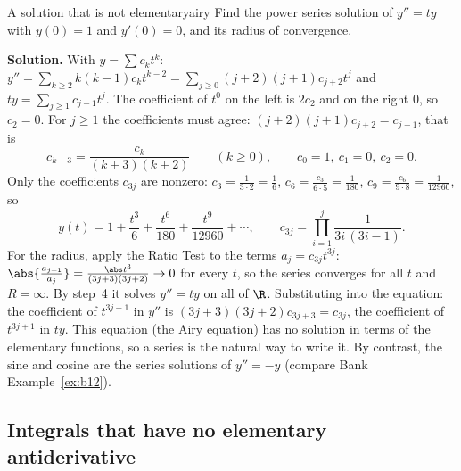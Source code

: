 \documentclass[11pt]{article}
\begin{document}
\begin{exmp}{A solution that is not elementary}{airy}
Find the power series solution of $y''=ty$ with $y(0)=1$ and $y'(0)=0$, and its radius of convergence.

\textbf{Solution.} With $y=\sum c_kt^k$: $y''=\sum_{k\ge2}k(k-1)c_kt^{k-2}=\sum_{j\ge0}(j+2)(j+1)c_{j+2}t^j$ and $ty=\sum_{j\ge1}c_{j-1}t^j$. The coefficient of $t^0$ on the left is $2c_2$ and on the right $0$, so $c_2=0$. For $j\ge1$ the coefficients must agree: $(j+2)(j+1)c_{j+2}=c_{j-1}$, that is
\[
c_{k+3}=\frac{c_k}{(k+3)(k+2)}\qquad(k\ge0),\qquad c_0=1,\ c_1=0,\ c_2=0 .
\]
Only the coefficients $c_{3j}$ are nonzero: $c_3=\frac{1}{3\cdot2}=\frac16$, $c_6=\frac{c_3}{6\cdot5}=\frac1{180}$, $c_9=\frac{c_6}{9\cdot8}=\frac1{12960}$, so
\[
y(t)=1+\frac{t^3}6+\frac{t^6}{180}+\frac{t^9}{12960}+\cdots,\qquad c_{3j}=\prod_{i=1}^{j}\frac1{3i\,(3i-1)}.
\]
For the radius, apply the Ratio Test to the terms $a_j=c_{3j}t^{3j}$: $\abs{\frac{a_{j+1}}{a_j}}=\frac{\abs t^3}{(3j+3)(3j+2)}\to0$ for every $t$, so the series converges for all $t$ and $R=\infty$. By step~4 it solves $y''=ty$ on all of $\R$. Substituting into the equation: the coefficient of $t^{3j+1}$ in $y''$ is $(3j+3)(3j+2)c_{3j+3}=c_{3j}$, the coefficient of $t^{3j+1}$ in $ty$.
This equation (the Airy equation) has no solution in terms of the elementary functions, so a series is the natural way to write it. By contrast, the sine and cosine are the series solutions of $y''=-y$ (compare Bank Example~\ref{ex:b12}).
\end{exmp}

\subsection*{Integrals that have no elementary antiderivative}
\end{document}
